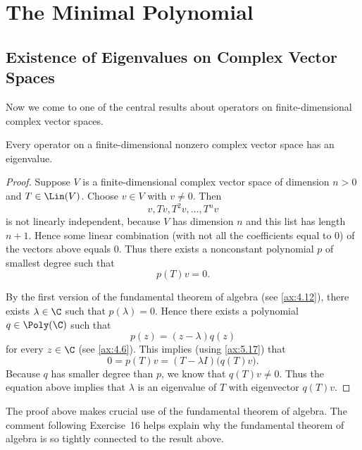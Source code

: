 \iftestbuild %
\setcounter{section}{1}\setcounter{theorem}{18}
\fi %
\DeclareRobustCommand\axeqtag{\refstepcounter{theorem}%
  \begingroup\edef\x{\endgroup\noexpand\tag{\thetheorem}}\x}

\section{The Minimal Polynomial}

\subsection{Existence of Eigenvalues on Complex Vector Spaces}

Now we come to one of the central results about operators on finite-dimensional
complex vector spaces.

\begin{result}\label{ax:5.19}
Every operator on a finite-dimensional nonzero complex vector space has an
eigenvalue.
\end{result}

\begin{proof}
Suppose $V$ is a finite-dimensional complex vector space of dimension $n>0$
and $T\in\Lin(V)$. Choose $v\in V$ with $v\ne0$. Then
\[ v,Tv,T^2v,\dots,T^nv \]
is not linearly independent, because $V$ has dimension $n$ and this list has
length $n+1$. Hence some linear combination (with not all the coefficients
equal to $0$) of the vectors above equals $0$. Thus there exists a nonconstant
polynomial $p$ of smallest degree such that
\[ p(T)v=0. \]

By the first version of the fundamental theorem of algebra (see
\ref{ax:4.12}), there exists $\lambda\in\C$ such that $p(\lambda)=0$. Hence
there exists a polynomial $q\in\Poly(\C)$ such that
\[ p(z)=(z-\lambda)q(z) \]
for every $z\in\C$ (see \ref{ax:4.6}). This implies (using \ref{ax:5.17}) that
\[ 0=p(T)v=(T-\lambda I)\bigl(q(T)v\bigr). \]
Because $q$ has smaller degree than $p$, we know that $q(T)v\ne0$. Thus the
equation above implies that $\lambda$ is an eigenvalue of $T$ with eigenvector
$q(T)v$.
\end{proof}

The proof above makes crucial use of the fundamental theorem of algebra. The
comment following Exercise~16 helps explain why the fundamental theorem of
algebra is so tightly connected to the result above.

